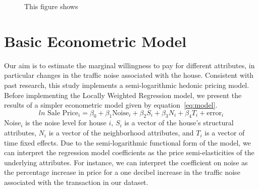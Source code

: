 \documentclass{article}\usepackage{graphicx, color}
\begin{document}
\begin{figure}
\caption{This figure shows }\label{fig:SalesYear}
\end{figure}

\section{Basic Econometric Model}\label{basicModel}
Our aim is to estimate the marginal willingness to pay for different attributes, in particular changes in the traffic noise associated with the house. Consistent with past research, this study implements a semi-logarithmic hedonic pricing model.  Before implementing the Locally Weighted Regression model, we present the results of a simpler econometric model given by equation~\eqref{eq:model}.
\begin{equation}\label{eq:model}	
ln \textrm{ Sale Price}_i = \beta _0 + \beta _1 \textrm{Noise}_i+ \beta _2 S_i+ \beta _3 N_i + \beta _4 T_i + \textrm{error}_i
\end{equation}
Noise$_i$ is the noise level for house $i$, $S_i$ is a vector of the house's structural attributes, $N_i$ is a vector of the neighborhood attributes, and $T_i$ is a vector of time fixed effects. Due to the semi-logarithmic functional form of the model, we can interpret the regression model coefficients as the price semi-elasticities of the underlying attributes. For instance, we can interpret the coefficient on noise as the percentage increase in price for a one decibel increase in the traffic noise associated with the transaction in our dataset. 
\end{document}
